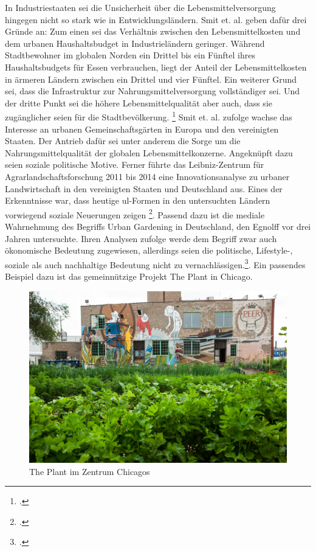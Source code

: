 \documentclass{scrartcl}
\begin{document}
In Industriestaaten sei die Unsicherheit über die Lebensmittelversorgung hingegen nicht so stark wie in Entwicklungsländern. Smit et. al. geben dafür drei Gründe an: Zum einen sei das Verhältnis zwischen den Lebensmittelkosten und dem urbanen Haushaltsbudget in Industrieländern geringer. Während Stadtbewohner im globalen Norden ein Drittel bis ein Fünftel ihres Haushaltsbudgets für Essen verbrauchen, liegt der Anteil der Lebensmittelkosten in ärmeren Ländern zwischen ein Drittel und vier Fünftel. Ein weiterer Grund sei, dass die Infrastruktur zur Nahrungsmittelversorgung vollständiger sei. Und der dritte Punkt sei die höhere Lebensmittelqualität aber auch, dass sie zugänglicher seien für die Stadtbevölkerung. \footcites[Vgl.][S.27]{Smit2001UrbanToday} Smit et. al. zufolge wachse das Interesse an urbanen Gemeinschaftsgärten in Europa und den vereinigten Staaten. Der Antrieb dafür sei unter anderem die Sorge um die Nahrungsmittelqualität der globalen Lebensmittelkonzerne. Angeknüpft dazu seien soziale politische Motive. Ferner führte das Leibniz-Zentrum für Agrarlandschaftsforschung 2011 bis 2014 eine Innovationsanalyse zu urbaner Landwirtschaft in den vereinigten Staaten und Deutschland aus. Eines der Erkenntnisse war, dass heutige \acs{ul}-Formen in den untersuchten Ländern vorwiegend soziale Neuerungen zeigen \footcite{Berges2014UrbaneStadt}. Passend dazu ist die mediale Wahrnehmung des Begriffs Urban Gardening in Deutschland, den Egnolff vor drei Jahren untersuchte. Ihren Analysen zufolge werde dem Begriff zwar auch ökonomische Bedeutung zugewiesen, allerdings seien die politische, Lifestyle-, soziale als auch nachhaltige Bedeutung nicht zu vernachlässigen.\footcite[Vgl.][S.119ff]{Egnolff2015DieIdeal}. Ein passendes Beispiel dazu ist das gemeinnützige Projekt The Plant in Chicago.

\begin{figure}[htbp]
    \centering
    \includegraphics[width=14cm]{image_folder/the_plant_1.jpg}
    \caption{The Plant im Zentrum Chicagos}
\end{figure} 
\end{document}
